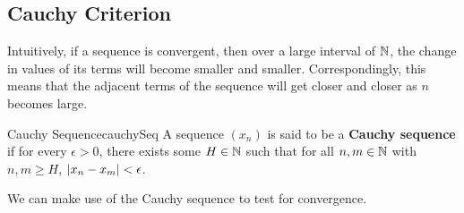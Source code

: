 \documentclass[math]{amznotes}
\theoremstyle{remark}
\begin{document}
\subsection{Cauchy Criterion}
Intuitively, if a sequence is convergent, then over a large interval of $\mathbb{N}$, the change in values of its terms will become smaller and smaller. Correspondingly, this means that the adjacent terms of the sequence will get closer and closer as $n$ becomes large.
\begin{dfnbox}{Cauchy Sequence}{cauchySeq}
    A sequence $(x_n)$ is said to be a {\color{red} \textbf{Cauchy sequence}} if for every $\epsilon > 0$, there exists some $H \in \mathbb{N}$ such that for all $n, m \in \mathbb{N}$ with $n, m \geq H$, ${\left\lvert {x_n - x_m} \right\rvert} < \epsilon$.
\end{dfnbox}
We can make use of the Cauchy sequence to test for convergence.
\end{document}
